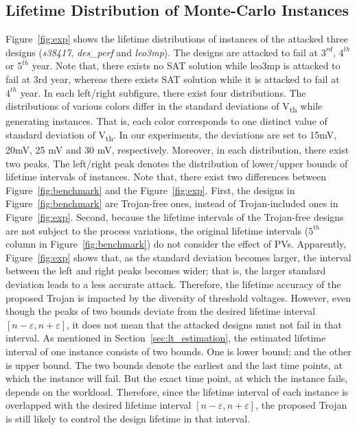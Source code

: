 \subsection{Lifetime Distribution of Monte-Carlo Instances}
\label{sec:exp:exp}
Figure~\ref{fig:exp} shows the lifetime distributions of instances of the attacked three designs (\textit{s38417}, \textit{des\_perf} and \textit{leo3mp}). The designs are attacked to fail at $3^{rd}$, $4^{th}$ or $5^{th}$ year. Note that, there exists no SAT solution while leo3mp is attacked to fail at 3rd year, whereas there exists SAT solution while it is attacked to fail at $4^{th}$ year. In each left/right subfigure, there exist four distributions. The distributions of various colors differ in the standard deviations of V\textsubscript{th} while generating instances. That is, each color corresponds to one distinct value of standard deviation of V\textsubscript{th}. In our experiments, the deviations are set to 15mV, 20mV, 25 mV and 30 mV, respectively. Moreover, in each distribution, there exist two peaks. The left/right peak denotes the distribution of lower/upper bounds of lifetime intervals of instances. Note that, there exist two differences between Figure~\ref{fig:benchmark} and the Figure~\ref{fig:exp}. First, the designs in Figure~\ref{fig:benchmark} are Trojan-free ones, instead of Trojan-included ones in Figure~\ref{fig:exp}. Second, because the lifetime intervals of the Trojan-free designs are not subject to the process variations, the original lifetime intervals ($5^{th}$ column in Figure~\ref{fig:benchmark}) do not consider the effect of PVs.
Apparently, Figure~\ref{fig:exp} shows that, as the standard deviation becomes larger, the interval between the left and right peaks becomes wider; that is, the larger standard deviation leads to a less accurate attack. Therefore, the lifetime accuracy of the proposed Trojan is impacted by the diversity of threshold voltages. However, even though the peaks of two bounds deviate from the desired lifetime interval $[n - \varepsilon, n + \varepsilon]$, it does not mean that the attacked designs must not fail in that interval. As mentioned in Section~\ref{sec:lt_estimation}, the estimated lifetime interval of one instance consists of two bounds. One is lower bound; and the other is upper bound. The two bounds denote the earliest and the last time points, at which the instance will fail. But the exact time point, at which the instance fails, depends on the workload. Therefore, since the lifetime interval of each instance is overlapped with the desired lifetime interval $[n - \varepsilon, n + \varepsilon]$, the proposed Trojan is still likely to control the design lifetime in that interval.

